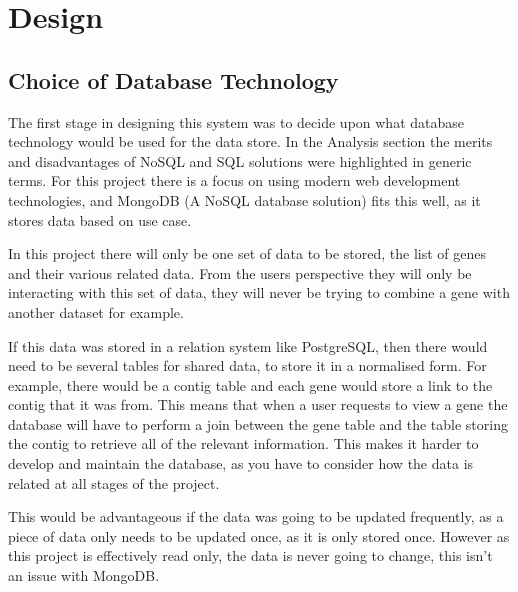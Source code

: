 \section{Design}
% 
% 
% 

\subsection{Choice of Database Technology}
The first stage in designing this system was to decide upon what database technology would be used for the data store. In the Analysis section the merits and disadvantages of NoSQL and SQL solutions were highlighted in generic terms. For this project there is a focus on using modern web development technologies, and MongoDB (A NoSQL database solution) fits this well, as it stores data based on use case. 

In this project there will only be one set of data to be stored, the list of genes and their various related data. From the users perspective they will only be interacting with this set of data, they will never be trying to combine a gene with another dataset for example. 

If this data was stored in a relation system like PostgreSQL, then there would need to be several tables for shared data, to store it in a normalised form. For example, there would be a contig table and each gene would store a link to the contig that it was from. This means that when a user requests to view a gene the database will have to perform a join between the gene table and the table storing the contig to retrieve all of the relevant information. This makes it harder to develop and maintain the database, as you have to consider how the data is related at all stages of the project. 

This would be advantageous if the data was going to be updated frequently, as a piece of data only needs to be updated once, as it is only stored once. However as this project is effectively read only, the data is never going to change, this isn't an issue with MongoDB.

